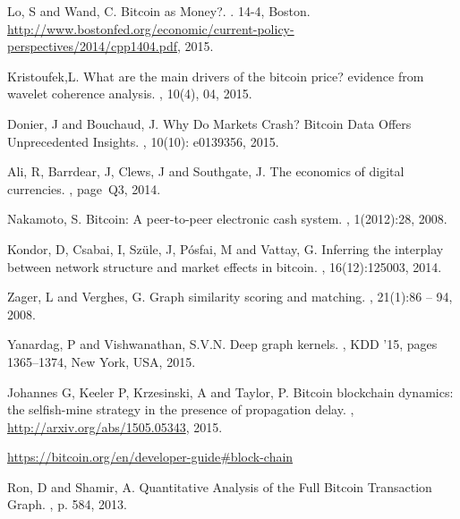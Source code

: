 \begin{thebibliography}{99}
\setlength{\parskip}{1em}

 Lo, S and Wand, C. 
\newblock Bitcoin as Money?.
. 14-4, Boston.
\newblock \url {http://www.bostonfed.org/economic/current-policy-perspectives/2014/cpp1404.pdf}, 2015.

 Kristoufek,L.
\newblock What are the main drivers of the bitcoin price? evidence
from wavelet coherence analysis. 
, 10(4), 04, 2015.

 Donier, J and Bouchaud, J.
\newblock Why Do Markets Crash? Bitcoin Data Offers Unprecedented Insights.
, 10(10): e0139356, 2015.

Ali, R, Barrdear, J, Clews, J and Southgate, J.
\newblock The economics of digital currencies.
, page~Q3, 2014.

 Nakamoto, S.
\newblock Bitcoin: A peer-to-peer electronic cash system.
, 1(2012):28, 2008.

 Kondor, D, Csabai, I, Sz{\"{u}}le, J, P{\'{o}}sfai, M and Vattay,  G.
\newblock Inferring the interplay between network structure and market
effects in bitcoin.
, 16(12):125003, 2014.

 Zager, L and Verghes, G. 
\newblock Graph similarity scoring and matching. 
, 21(1):86 – 94, 2008.

 Yanardag, P and Vishwanathan, S.V.N. 
\newblock Deep graph kernels. 
, KDD ’15, pages 1365–1374, New York, USA, 2015.

 Johannes G, Keeler P, Krzesinski, A and Taylor, P. 
\newblock Bitcoin blockchain dynamics: the selfish-mine strategy in the
presence of propagation delay.
,
\newblock \url {http://arxiv.org/abs/1505.05343}, 2015.

\newblock \url {https://bitcoin.org/en/developer-guide#block-chain}

 Ron, D and Shamir, A.
\newblock Quantitative Analysis of the Full Bitcoin Transaction Graph.
, p. 584, 2013.


\end{thebibliography}
